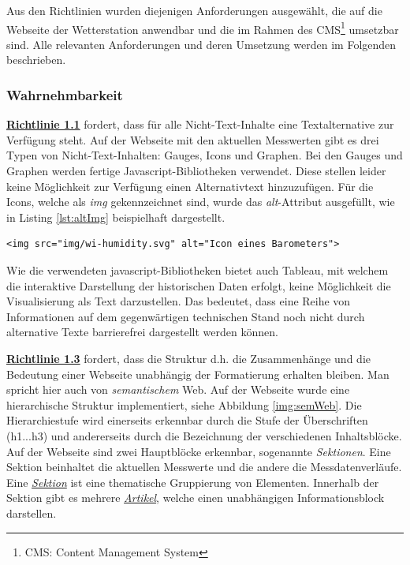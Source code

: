 \noindent
Aus den Richtlinien wurden diejenigen Anforderungen ausgewählt, die auf die Webseite der Wetterstation anwendbar und die im Rahmen des CMS\footnote{CMS: Content Management System} umsetzbar sind. Alle relevanten Anforderungen und deren Umsetzung werden im Folgenden beschrieben.

\subsubsection{Wahrnehmbarkeit}
\href{https://www.w3.org/Translations/WCAG20-de/#text-equiv}{\textbf{Richtlinie 1.1}} fordert, dass für alle Nicht-Text-Inhalte eine Textalternative zur Verfügung steht. Auf der Webseite mit den aktuellen Messwerten gibt es drei Typen von Nicht-Text-Inhalten: Gauges, Icons und Graphen. Bei den Gauges und Graphen werden fertige Javascript-Bibliotheken verwendet. Diese stellen leider keine Möglichkeit zur Verfügung einen Alternativtext hinzuzufügen. Für die Icons, welche als \textit{img} gekennzeichnet sind, wurde das \textit{alt}-Attribut ausgefüllt, wie in Listing \ref{lst:altImg} beispielhaft dargestellt.

\begin{lstlisting}[label=lst:altImg,caption=Alternativtext für Icons, language=HTML5, style=htmlcssjs]
<img src="img/wi-humidity.svg" alt="Icon eines Barometers">
\end{lstlisting}

\noindent
Wie die verwendeten javascript-Bibliotheken bietet auch Tableau, mit welchem die interaktive Darstellung der historischen Daten erfolgt, keine Möglichkeit die Visualisierung als Text darzustellen. Das bedeutet, dass eine Reihe von Informationen auf dem gegenwärtigen technischen Stand noch nicht durch alternative Texte barrierefrei dargestellt werden können. \newline

\noindent
\href{https://www.w3.org/Translations/WCAG20-de/#text-equiv}{\textbf{Richtlinie 1.3}} fordert, dass die Struktur d.h. die Zusammenhänge und die Bedeutung einer Webseite unabhängig der Formatierung erhalten bleiben. Man spricht hier auch von \textit{semantischem} Web. Auf der Webseite wurde eine hierarchische Struktur implementiert, siehe Abbildung \ref{img:semWeb}. Die Hierarchiestufe wird einerseits erkennbar durch die Stufe der Überschriften (h1...h3) und andererseits durch die Bezeichnung der verschiedenen Inhaltsblöcke. Auf der Webseite sind zwei Hauptblöcke erkennbar, sogenannte \textit{Sektionen}. Eine Sektion beinhaltet die aktuellen Messwerte und die andere die Messdatenverläufe. Eine \href{https://www.w3.org/TR/2011/WD-html5-20110525/sections.html#the-section-element}{\textit{Sektion}} ist eine thematische Gruppierung von Elementen. Innerhalb der Sektion gibt es mehrere \href{https://www.w3.org/TR/2011/WD-html5-20110525/sections.html#the-article-element}{\textit{Artikel}}, welche einen unabhängigen Informationsblock darstellen.

